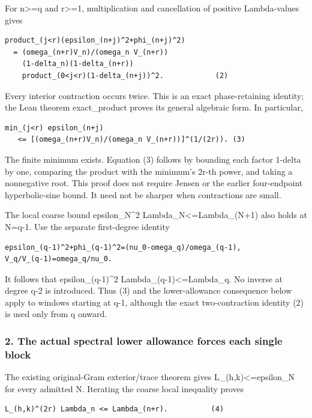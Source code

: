 For n\textgreater=q and r\textgreater=1, multiplication and cancellation of positive Lambda-values gives

\begin{verbatim}
product_(j<r)(epsilon_(n+j)^2+phi_(n+j)^2)
  = (omega_(n+r)V_n)/(omega_n V_(n+r))
    (1-delta_n)(1-delta_(n+r))
    product_(0<j<r)(1-delta_(n+j))^2.            (2)
\end{verbatim}

Every interior contraction occurs twice. This is an exact phase-retaining identity; the Lean theorem exact\_product proves its general algebraic form. In particular,

\begin{verbatim}
min_(j<r) epsilon_(n+j)
   <= [(omega_(n+r)V_n)/(omega_n V_(n+r))]^(1/(2r)). (3)
\end{verbatim}

The finite minimum exists. Equation (3) follows by bounding each factor 1-delta by one, comparing the product with the minimum's 2r-th power, and taking a nonnegative root. This proof does not require Jensen or the earlier four-endpoint hyperbolic-sine bound. It need not be sharper when contractions are small.

The local coarse bound epsilon\_N\^{}2 Lambda\_N\textless=Lambda\_(N+1) also holds at N=q-1. Use the separate first-degree identity

\begin{verbatim}
epsilon_(q-1)^2+phi_(q-1)^2=(nu_0-omega_q)/omega_(q-1),
V_q/V_(q-1)=omega_q/nu_0.
\end{verbatim}

It follows that epsilon\_(q-1)\^{}2 Lambda\_(q-1)\textless=Lambda\_q. No inverse at degree q-2 is introduced. Thus (3) and the lower-allowance consequence below apply to windows starting at q-1, although the exact two-contraction identity (2) is used only from q onward.

\subsubsection{2. The actual spectral lower allowance forces each single block}\label{endpoint-pr25_consecutive_original--the-actual-spectral-lower-allowance-forces-each-single-block}

The existing original-Gram exterior/trace theorem gives L\_(h,k)\textless=epsilon\_N for every admitted N. Iterating the coarse local inequality proves

\begin{verbatim}
L_(h,k)^(2r) Lambda_n <= Lambda_(n+r).          (4)
\end{verbatim}

